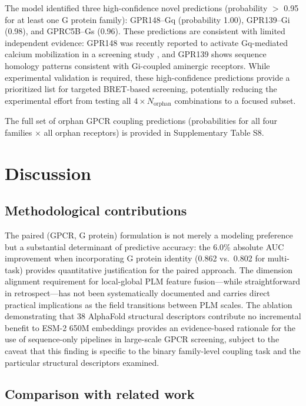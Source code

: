 \documentclass[11pt,a4paper]{article}
\begin{document}
The model identified three high-confidence novel predictions (probability $>$ 0.95 for at least one G protein family): GPR148--Gq (probability 1.00), GPR139--Gi (0.98), and GPRC5B--Gs (0.96). These predictions are consistent with limited independent evidence: GPR148 was recently reported to activate Gq-mediated calcium mobilization in a screening study \cite{foster2019discovery}, and GPR139 shows sequence homology patterns consistent with Gi-coupled aminergic receptors. While experimental validation is required, these high-confidence predictions provide a prioritized list for targeted BRET-based screening, potentially reducing the experimental effort from testing all $4 \times N_{\text{orphan}}$ combinations to a focused subset.

The full set of orphan GPCR coupling predictions (probabilities for all four families $\times$ all orphan receptors) is provided in Supplementary Table S8.

\section{Discussion}

\subsection{Methodological contributions}

The paired (GPCR, G protein) formulation is not merely a modeling preference but a substantial determinant of predictive accuracy: the 6.0\% absolute AUC improvement when incorporating G protein identity (0.862 vs.\ 0.802 for multi-task) provides quantitative justification for the paired approach. The dimension alignment requirement for local-global PLM feature fusion---while straightforward in retrospect---has not been systematically documented and carries direct practical implications as the field transitions between PLM scales. The ablation demonstrating that 38 AlphaFold structural descriptors contribute no incremental benefit to ESM-2 650M embeddings provides an evidence-based rationale for the use of sequence-only pipelines in large-scale GPCR screening, subject to the caveat that this finding is specific to the binary family-level coupling task and the particular structural descriptors examined.

\subsection{Comparison with related work}
\end{document}
